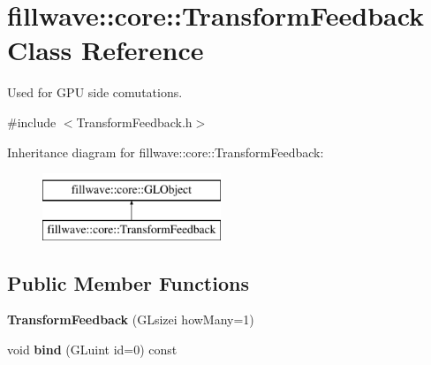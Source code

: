 \hypertarget{classfillwave_1_1core_1_1TransformFeedback}{}\section{fillwave\+:\+:core\+:\+:Transform\+Feedback Class Reference}
\label{classfillwave_1_1core_1_1TransformFeedback}


Used for G\+P\+U side comutations.  




{\ttfamily \#include $<$Transform\+Feedback.\+h$>$}

Inheritance diagram for fillwave\+:\+:core\+:\+:Transform\+Feedback\+:\begin{figure}[H]
\begin{center}
\leavevmode
\includegraphics[height=2.000000cm]{classfillwave_1_1core_1_1TransformFeedback}
\end{center}
\end{figure}
\subsection*{Public Member Functions}
\begin{DoxyCompactItemize}
\item 
\hypertarget{classfillwave_1_1core_1_1TransformFeedback_a327ae269511188c24f1144f5f65795d5}{}{\bfseries Transform\+Feedback} (G\+Lsizei how\+Many=1)\label{classfillwave_1_1core_1_1TransformFeedback_a327ae269511188c24f1144f5f65795d5}

\item 
\hypertarget{classfillwave_1_1core_1_1TransformFeedback_a477cfa588d372dc15789b3378fbfeceb}{}void {\bfseries bind} (G\+Luint id=0) const \label{classfillwave_1_1core_1_1TransformFeedback_a477cfa588d372dc15789b3378fbfeceb}

\end{DoxyCompactItemize}
